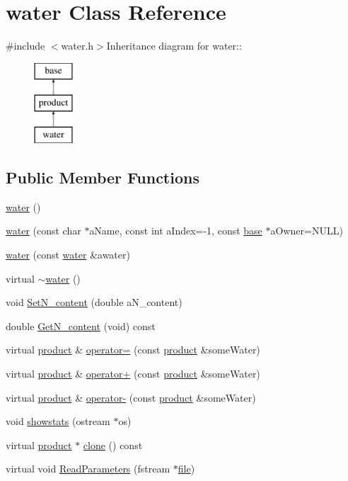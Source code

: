\hypertarget{classwater}{
\section{water Class Reference}
\label{classwater}
}


{\ttfamily \#include $<$water.h$>$}Inheritance diagram for water::\begin{figure}[H]
\begin{center}
\leavevmode
\includegraphics[height=3cm]{classwater}
\end{center}
\end{figure}
\subsection*{Public Member Functions}
\begin{DoxyCompactItemize}
\item 
\hyperlink{classwater_a0b78bb6c3760b5d3e560224e540f988e}{water} ()
\item 
\hyperlink{classwater_a29748f38fa7f940a045e62bc1d987f27}{water} (const char $\ast$aName, const int aIndex=-\/1, const \hyperlink{classbase}{base} $\ast$aOwner=NULL)
\item 
\hyperlink{classwater_a20122d81fff5135054604e7ebc63bc7b}{water} (const \hyperlink{classwater}{water} \&awater)
\item 
virtual \hyperlink{classwater_acb7ca46dc51e8ed1855826d84ebb255e}{$\sim$water} ()
\item 
void \hyperlink{classwater_a7380d9cbf2fc3be1d200b9583267c4ba}{SetN\_\-content} (double aN\_\-content)
\item 
double \hyperlink{classwater_af7e3ec493176d6dc5eb75d688ba2b1fc}{GetN\_\-content} (void) const 
\item 
virtual \hyperlink{classproduct}{product} \& \hyperlink{classwater_aa4611d10961d930814c6f24cd9b8a066}{operator=} (const \hyperlink{classproduct}{product} \&someWater)
\item 
virtual \hyperlink{classproduct}{product} \& \hyperlink{classwater_a3c598f40a21761c6945ac73521d68d3e}{operator+} (const \hyperlink{classproduct}{product} \&someWater)
\item 
virtual \hyperlink{classproduct}{product} \& \hyperlink{classwater_ae7f1f4f0d058090bb747b3f10d6f4c79}{operator-\/} (const \hyperlink{classproduct}{product} \&someWater)
\item 
void \hyperlink{classwater_a9f619e4772b1c0cb803e9595d680bcfe}{showstats} (ostream $\ast$os)
\item 
virtual \hyperlink{classproduct}{product} $\ast$ \hyperlink{classwater_ad3802425a88e7734530ac3d13feac437}{clone} () const 
\item 
virtual void \hyperlink{classwater_aab74d08e63e58b7c8d3f2ef482673a21}{ReadParameters} (fstream $\ast$\hyperlink{classbase_a3af52ee9891719d09b8b19b42450b6f6}{file})
\end{DoxyCompactItemize}
